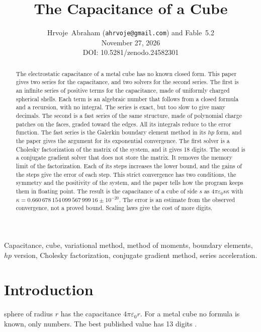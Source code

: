 \documentclass[journal]{IEEEtran}
\newcommand{\doiline}{DOI: 10.5281/zenodo.24582301}
\begin{document}
\title{The Capacitance of a Cube}

\author{Hrvoje~Abraham (\texttt{ahrvoje@gmail.com}) and Fable~5.2\\[3pt]
November 27, 2026\\[3pt]
\doiline}

\maketitle

\begin{abstract}
The electrostatic capacitance of a metal cube has no known closed form. This paper gives two series for the capacitance, and two solvers for the second series. The first is an infinite series of positive terms for the capacitance, made of uniformly charged spherical shells. Each term is an algebraic number that follows from a closed formula and a recursion, with no integral. The series is exact, but too slow to give many decimals. The second is a fast series of the same structure, made of polynomial charge patches on the faces, graded toward the edges. All its integrals reduce to the error function. The fast series is the Galerkin boundary element method in its $hp$ form, and the paper gives the argument for its exponential convergence. The first solver is a Cholesky factorization of the matrix of the system, and it gives 18 digits. The second is a conjugate gradient solver that does not store the matrix. It removes the memory limit of the factorization. Each of its steps increases the lower bound, and the gains of the steps give the error of each step. This strict convergence has two conditions, the symmetry and the positivity of the system, and the paper tells how the program keeps them in floating point. The result is the capacitance of a cube of side $s$ as $4\pi\varepsilon_0 s\kappa$ with $\kappa = 0.660\,678\,154\,099\,567\,999\,16 \pm 10^{-20}$. The error is an estimate from the observed convergence, not a proved bound. Scaling laws give the cost of more digits.
\end{abstract}

\begin{IEEEkeywords}
Capacitance, cube, variational method, method of moments, boundary elements, $hp$ version, Cholesky factorization, conjugate gradient method, series acceleration.
\end{IEEEkeywords}

\section{Introduction}
 sphere of radius $r$ has the capacitance $4\pi\varepsilon_0 r$. For a metal cube no formula is known, only numbers. The best published value has 13 digits \cite{helsing}.
\end{document}
